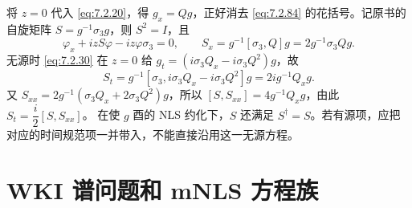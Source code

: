 \documentclass[lang=cn,scheme=chinese,mode=simple,device=normal,color=blue,math=cm,thmcnt=section,12pt]{elegantbook}
\begin{document}
\begin{callout}[计算：空间规范和铁磁链方程]
将 $z=0$ 代入 \eqref{eq:7.2.20}，得 $g_x=Qg$，正好消去 \eqref{eq:7.2.84} 的花括号。记原书的自旋矩阵
$S=g^{-1}\sigma_3g$，则 $S^2=I$，且
\[
\varphi_x+izS\varphi-iz\varphi\sigma_3=0,\qquad
S_x=g^{-1}[\sigma_3,Q]g=2g^{-1}\sigma_3Qg.
\]
无源时 \eqref{eq:7.2.30} 在 $z=0$ 给 $g_t=(i\sigma_3Q_x-i\sigma_3Q^2)g$，故
\[
S_t=g^{-1}[\sigma_3,i\sigma_3Q_x-i\sigma_3Q^2]g=2ig^{-1}Q_xg.
\]
又 $S_{xx}=2g^{-1}(\sigma_3Q_x+2\sigma_3Q^2)g$，所以
$[S,S_{xx}]=4g^{-1}Q_xg$，由此 $S_t=\dfrac{i}{2}[S,S_{xx}]$。
在使 $g$ 酉的 NLS 约化下，$S$ 还满足 $S^\dagger=S$。若有源项，应把对应的时间规范项一并带入，不能直接沿用这一无源方程。
\end{callout}

\section{WKI 谱问题和 mNLS 方程族}
\end{document}
